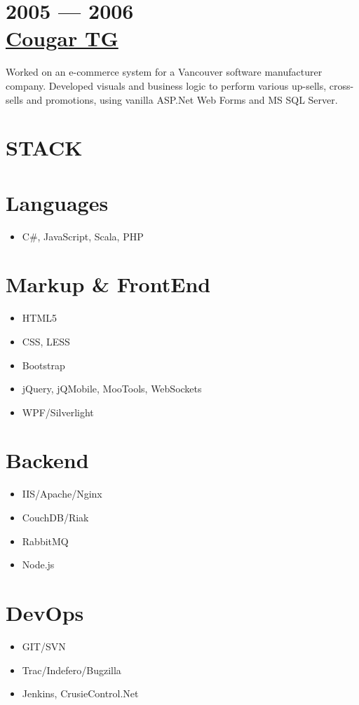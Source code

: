 \documentclass[margin]{res}
\begin{document}
\begin{resume}
	\section{2005 --- 2006\\\href{http://cougartg.com}{Cougar TG}}
	Worked on an e-commerce system for a Vancouver software manufacturer company. Developed visuals and business logic to perform various up-sells, cross-sells and promotions, using vanilla ASP.Net Web Forms and MS SQL Server.

\section{STACK} 
	\normalsize{\section{Languages}}
		\itemsep -2pt
 		\begin{itemize}
 			\item C\#, JavaScript, Scala, PHP
		\end{itemize}
	\normalsize{\section{Markup \& FrontEnd}}
		\itemsep -2pt
		\begin{itemize}
			\item HTML5
			\item CSS, LESS
			\item Bootstrap
			\item jQuery, jQMobile, MooTools, WebSockets
			\item WPF/Silverlight
		\end{itemize}
	\normalsize{\section{Backend}}
		\begin{itemize}
			\item IIS/Apache/Nginx
			\item CouchDB/Riak
			\item RabbitMQ
			\item Node.js
		\end{itemize}
	\normalsize{\section{DevOps}}
		\begin{itemize}
			\item GIT/SVN
			\item Trac/Indefero/Bugzilla
			\item Jenkins, CrusieControl.Net
		\end{itemize}
\newpage

\end{resume}
\end{document}
